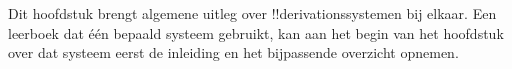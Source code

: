 \documentclass[../../../include/open-logic-chapter]{subfiles}
\begin{document}
      {}
      {}

\begin{editorial}
Dit hoofdstuk brengt algemene uitleg over !!{derivation}ssystemen bij
elkaar. Een leerboek dat één bepaald systeem gebruikt, kan aan het begin
van het hoofdstuk over dat systeem eerst de inleiding en het bijpassende
overzicht opnemen.
\end{editorial}






\OLEndChapterHook
\end{document}
